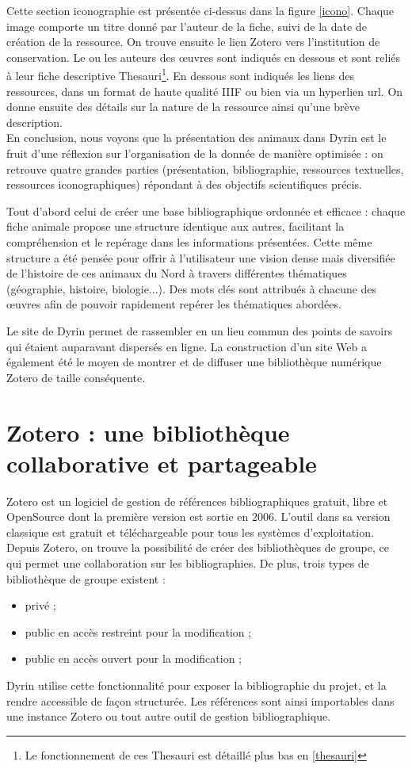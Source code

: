 \documentclass[a4paper,12pt,twoside]{book}
\begin{document}
Cette section iconographie est présentée ci-dessus dans la figure \ref{icono}. Chaque image comporte un titre donné par l'auteur de la fiche, suivi de la date de création de la ressource. On trouve ensuite le lien Zotero vers l'institution de conservation. Le ou les auteurs des \oe{}uvres sont indiqués en dessous et sont reliés à leur fiche descriptive Thesauri\footnote{Le fonctionnement de ces Thesauri est détaillé plus bas en \ref{thesauri}}. En dessous sont indiqués les liens des ressources, dans un format de haute qualité \acrshort{IIIF} ou bien via un hyperlien url. On donne ensuite des détails sur la nature de la ressource ainsi qu'une brève description.\\


En conclusion, nous voyons que la présentation des animaux dans Dyrin est le fruit d'une réflexion sur l'organisation de la donnée de manière optimisée  : on retrouve quatre grandes parties (présentation, bibliographie, ressources textuelles, ressources iconographiques) répondant à des objectifs scientifiques précis.

Tout d'abord celui de créer une base bibliographique ordonnée et efficace : chaque fiche animale propose une structure identique aux autres, facilitant la compréhension et le repérage dans les informations présentées. Cette même structure a été pensée pour offrir à l'utilisateur une vision dense mais diversifiée de l'histoire de ces animaux du Nord à travers différentes thématiques (géographie, histoire, biologie...). Des mots clés sont attribués à chacune des \oe{}uvres afin de pouvoir rapidement repérer les thématiques abordées.

Le site de Dyrin permet de rassembler en un lieu commun des points de savoirs qui étaient auparavant dispersés en ligne. La construction d'un site Web a également été le moyen de montrer et de diffuser une bibliothèque numérique Zotero de taille conséquente.


\section{Zotero : une bibliothèque collaborative et partageable}\label{partie_zotero}

Zotero est un logiciel de gestion de références bibliographiques gratuit, libre et OpenSource dont la première version est sortie en 2006. L'outil dans sa version classique est gratuit et téléchargeable pour tous les systèmes d'exploitation. Depuis Zotero, on trouve la possibilité de créer des bibliothèques de groupe, ce qui permet une collaboration sur les bibliographies. De plus, trois types de bibliothèque de groupe existent :
\begin{itemize}
    \item privé ;
    \item public en accès restreint pour la modification ;
    \item public en accès ouvert pour la modification ;
\end{itemize}
Dyrin utilise cette fonctionnalité pour exposer la bibliographie du projet, et la rendre accessible de façon structurée. Les références sont ainsi importables dans une instance Zotero ou tout autre outil de gestion bibliographique.
\end{document}
